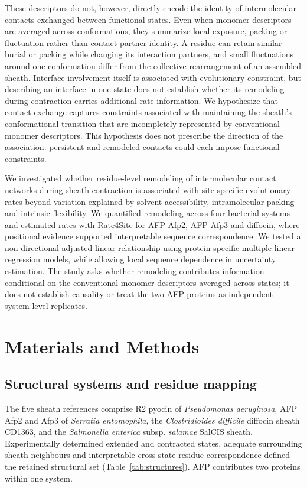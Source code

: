 \documentclass[11pt,a4paper]{article}
\begin{document}
These descriptors do not, however, directly encode the identity of intermolecular contacts exchanged between functional states. Even when monomer descriptors are averaged across conformations, they summarize local exposure, packing or fluctuation rather than contact partner identity. A residue can retain similar burial or packing while changing its interaction partners, and small fluctuations around one conformation differ from the collective rearrangement of an assembled sheath. Interface involvement itself is associated with evolutionary constraint,\cite{ref5} but describing an interface in one state does not establish whether its remodeling during contraction carries additional rate information. We hypothesize that contact exchange captures constraints associated with maintaining the sheath's conformational transition that are incompletely represented by conventional monomer descriptors. This hypothesis does not prescribe the direction of the association: persistent and remodeled contacts could each impose functional constraints.

We investigated whether residue-level remodeling of intermolecular contact networks during sheath contraction is associated with site-specific evolutionary rates beyond variation explained by solvent accessibility, intramolecular packing and intrinsic flexibility. We quantified remodeling across four bacterial systems and estimated rates with Rate4Site for AFP Afp2, AFP Afp3 and diffocin, where positional evidence supported interpretable sequence correspondence.\cite{ref8,ref9} We tested a non-directional adjusted linear relationship using protein-specific multiple linear regression models, while allowing local sequence dependence in uncertainty estimation. The study asks whether remodeling contributes information conditional on the conventional monomer descriptors averaged across states; it does not establish causality or treat the two AFP proteins as independent system-level replicates.

\section{Materials and Methods}

\subsection{Structural systems and residue mapping}

The five sheath references comprise R2 pyocin of \emph{Pseudomonas aeruginosa},\cite{ref1} AFP Afp2 and Afp3 of \emph{Serratia entomophila},\cite{ref2} the \emph{Clostridioides difficile} diffocin sheath CD1363,\cite{ref3} and the \emph{Salmonella enterica} subsp. \emph{salamae} SalCIS sheath.\cite{ref4} Experimentally determined extended and contracted states, adequate surrounding sheath neighbours and interpretable cross-state residue correspondence defined the retained structural set (Table~\ref{tab:structures}). AFP contributes two proteins within one system.
\end{document}

